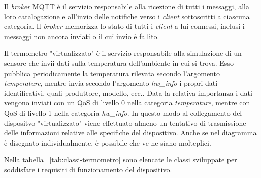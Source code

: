 Il \emph{broker} MQTT è il servizio responsabile alla ricezione di tutti i messaggi, alla loro catalogazione e all'invio delle notifiche verso i \emph{client} sottoscritti a ciascuna categoria.
Il \emph{broker} memorizza lo stato di tutti i \emph{client} a lui connessi, inclusi i messaggi non ancora inviati o il cui invio è fallito.


Il termometro "virtualizzato" è il servizio responsabile alla simulazione di un sensore che invii dati sulla temperatura dell'ambiente in cui si trova.
Esso pubblica periodicamente la temperatura rilevata secondo l'argomento \emph{temperature}, mentre invia secondo l'argomento \emph{hw\_info} i propri dati identificativi, quali produttore, modello, ecc..
Data la relativa importanza i dati vengono inviati con un QoS di livello 0 nella categoria \emph{temperature}, mentre con QoS di livello 1 nella categoria \emph{hw\_info}.
In questo modo al collegamento del dispositvo "virtualizzato" viene effettuato almeno un tentativo di trasmissione delle informazioni relative alle specifiche del dispositivo.
Anche se nel diagramma è disegnato individualmente, è possibile che ve ne siano molteplici.

Nella tabella ~\ref{tab:classi-termometro} sono elencate le classi sviluppate per soddisfare i requisiti di funzionamento del dispositivo.

